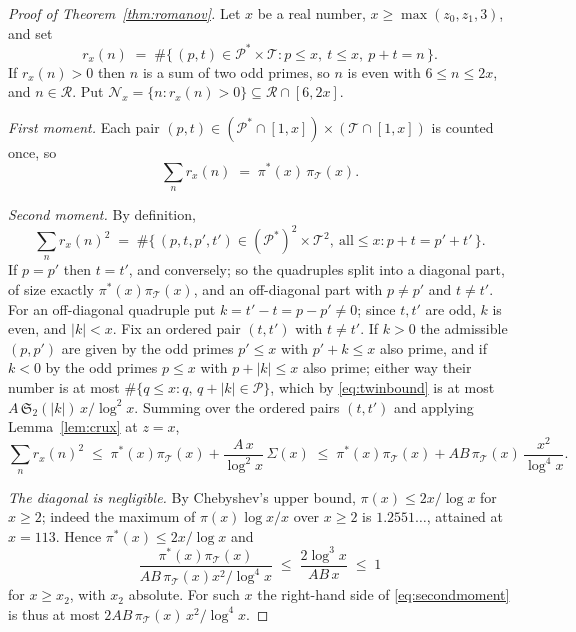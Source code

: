 \documentclass[10pt,a4paper]{amsart}
\newcommand{\PP}{\mathcal{P}}
\newcommand{\T}{\mathcal{T}}
\begin{document}
\begin{proof}[Proof of Theorem~\ref{thm:romanov}]
Let $x$ be a real number, $x \ge \max(z_0, z_1, 3)$, and set
\[
  r_x(n) \;=\; \#\{\, (p,t) \in \PP^{*}\times\T :
    p \le x,\ t \le x,\ p + t = n \,\}.
\]
If $r_x(n) > 0$ then $n$ is a sum of two odd primes, so $n$ is even with
$6 \le n \le 2x$, and $n \in \mathcal{R}$. Put
$\mathcal{N}_x = \{n : r_x(n) > 0\} \subseteq \mathcal{R}\cap[6,2x]$.

\emph{First moment.} Each pair $(p,t) \in (\PP^{*}\cap[1,x]) \times
(\T\cap[1,x])$ is counted once, so
\begin{equation}\label{eq:firstmoment}
  \sum_{n} r_x(n) \;=\; \pi^{*}(x)\,\pi_\T(x).
\end{equation}

\emph{Second moment.} By definition,
\[
  \sum_n r_x(n)^{2} \;=\;
  \#\{\, (p,t,p',t') \in (\PP^{*})^{2}\times\T^{2},\ \text{all} \le x :
    p + t = p' + t' \,\}.
\]
If $p = p'$ then $t = t'$, and conversely; so the quadruples split into a
diagonal part, of size exactly $\pi^{*}(x)\pi_\T(x)$, and an off-diagonal part
with $p \ne p'$ and $t \ne t'$. For an off-diagonal quadruple put
$k = t' - t = p - p' \ne 0$; since $t,t'$ are odd, $k$ is even, and $|k| < x$.
Fix an ordered pair $(t,t')$ with $t \ne t'$. If $k > 0$ the admissible
$(p,p')$ are given by the odd primes $p' \le x$ with $p'+k \le x$ also prime,
and if $k < 0$ by the odd primes $p \le x$ with $p + |k| \le x$ also prime;
either way their number is at most
$\#\{q \le x : q,\, q+|k| \in \PP\}$, which by \eqref{eq:twinbound} is at most
$A\,\mathfrak{S}_2(|k|)\,x/\log^{2}x$. Summing over the ordered pairs $(t,t')$
and applying Lemma~\ref{lem:crux} at $z = x$,
\begin{equation}\label{eq:secondmoment}
  \sum_n r_x(n)^{2}
  \;\le\; \pi^{*}(x)\pi_\T(x)
    + \frac{A\,x}{\log^{2}x}\,\Sigma(x)
  \;\le\; \pi^{*}(x)\pi_\T(x)
    + AB\,\pi_\T(x)\,\frac{x^{2}}{\log^{4}x}.
\end{equation}

\emph{The diagonal is negligible.} By Chebyshev's upper bound,
$\pi(x) \le 2x/\log x$ for $x \ge 2$; indeed the maximum of
$\pi(x)\log x / x$ over $x \ge 2$ is $1.2551\ldots$, attained at $x = 113$.
Hence $\pi^{*}(x) \le 2x/\log x$ and
\[
  \frac{\pi^{*}(x)\pi_\T(x)}{AB\,\pi_\T(x)x^{2}/\log^{4}x}
  \;\le\; \frac{2\log^{3}x}{AB\,x} \;\le\; 1
\]
for $x \ge x_2$, with $x_2$ absolute. For such $x$ the right-hand side
of \eqref{eq:secondmoment} is thus at most
$2AB\,\pi_\T(x)\,x^{2}/\log^{4}x$.


\end{proof}
\end{document}
